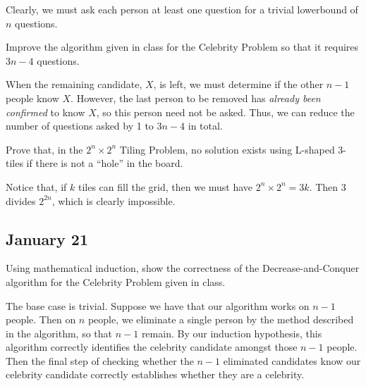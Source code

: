 \documentclass[final]{article}
\begin{document}
\begin{solution}
    Clearly, we must ask each person at least one question for a trivial lowerbound of $n$ questions.
\end{solution}

\begin{question}
    Improve the algorithm given in class for the Celebrity Problem so that it requires $3n - 4$ questions.
\end{question}

\begin{solution}
    When the remaining candidate, $X$, is left, we must determine if the other $n - 1$ people know $X$. However, the last person to be removed has \emph{already been confirmed} to know $X$, so this person need not be asked. Thus, we can reduce the number of questions asked by 1 to $3n - 4$ in total.
\end{solution}

\begin{question}
    Prove that, in the $2^n \times 2^n$ Tiling Problem, no solution exists using L-shaped 3-tiles if there is not a ``hole'' in the board.
\end{question}

\begin{solution}
    Notice that, if $k$ tiles can fill the grid, then we must have $2^n \times 2^n = 3k$. Then $3$ divides $2^{2n}$, which is clearly impossible.
\end{solution}

\subsection{January 21}
\begin{question}
    Using mathematical induction, show the correctness of the Decrease-and-Conquer algorithm for the Celebrity Problem given in class.
\end{question}

\begin{solution}
    The base case is trivial. Suppose we have that our algorithm works on $n - 1$ people. Then on $n$ people, we eliminate a single person by the method described in the algorithm, so that $n - 1$ remain. By our induction hypothesis, this algorithm correctly identifies the celebrity candidate amongst those $n - 1$ people. Then the final step of checking whether the $n - 1$ eliminated candidates know our celebrity candidate correctly establishes whether they are a celebrity.
\end{solution}
\end{document}
